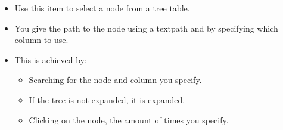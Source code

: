
\begin{itemize}
\item Use this item to select a node from a tree table.
\item You give the path to the node using a textpath and by specifying which column to use.
\item This is achieved by:
\begin{itemize}
\item Searching for the node and column you specify.
\item If the tree is not expanded, it is expanded.
\item Clicking on the node, the amount of times you specify. 
\end{itemize}
\end{itemize}
